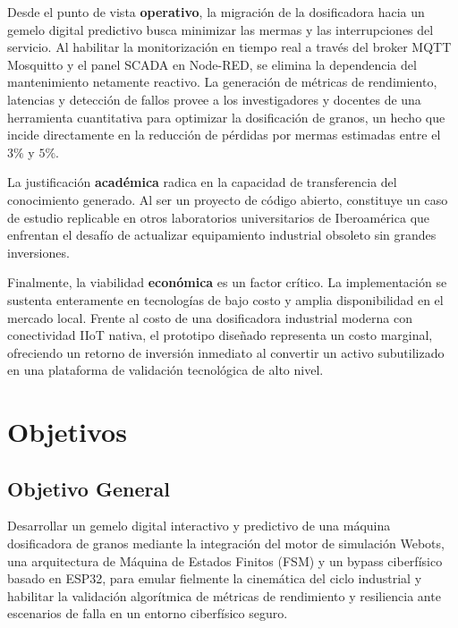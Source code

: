 Desde el punto de vista \textbf{operativo}, la migración de la dosificadora hacia un gemelo digital predictivo busca minimizar las mermas y las interrupciones del servicio. Al habilitar la monitorización en tiempo real a través del broker MQTT Mosquitto y el panel SCADA en Node-RED, se elimina la dependencia del mantenimiento netamente reactivo. La generación de métricas de rendimiento, latencias y detección de fallos provee a los investigadores y docentes de una herramienta cuantitativa para optimizar la dosificación de granos, un hecho que incide directamente en la reducción de pérdidas por mermas estimadas entre el $3\%$ y $5\%$.

La justificación \textbf{académica} radica en la capacidad de transferencia del conocimiento generado. Al ser un proyecto de código abierto, constituye un caso de estudio replicable en otros laboratorios universitarios de Iberoamérica que enfrentan el desafío de actualizar equipamiento industrial obsoleto sin grandes inversiones.

Finalmente, la viabilidad \textbf{económica} es un factor crítico. La implementación se sustenta enteramente en tecnologías de bajo costo y amplia disponibilidad en el mercado local. Frente al costo de una dosificadora industrial moderna con conectividad IIoT nativa, el prototipo diseñado representa un costo marginal, ofreciendo un retorno de inversión inmediato al convertir un activo subutilizado en una plataforma de validación tecnológica de alto nivel.

\section{Objetivos}
\subsection{Objetivo General}
Desarrollar un gemelo digital interactivo y predictivo de una máquina dosificadora de granos mediante la integración del motor de simulación Webots, una arquitectura de Máquina de Estados Finitos (FSM) y un bypass ciberfísico basado en ESP32, para emular fielmente la cinemática del ciclo industrial y habilitar la validación algorítmica de métricas de rendimiento y resiliencia ante escenarios de falla en un entorno ciberfísico seguro.

